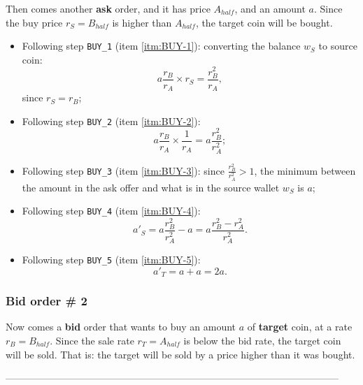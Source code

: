 \documentclass[a4paper,11pt]{article}
\newcommand\ddfrac[2]{\frac{\displaystyle #1}{\displaystyle #2}}
\begin{document}
Then comes another {\bf ask} order, and it has price $A_{half}$, and an amount $a$. Since the buy price 
$r_S = B_{half}$ is higher than $A_{half}$, the target coin will be bought.
	
\begin{itemize}
    \item Following step {\tt BUY\_1} (item \ref{itm:BUY-1}): 
	converting the balance $w_S$ to source coin: 
	\begin{equation*}
	    a \ddfrac{r_B}{r_A} \times r_S = \ddfrac{r_B^2}{r_A},
	\end{equation*}
	since $r_S = r_B$;
  
    \item Following step {\tt BUY\_2} (item \ref{itm:BUY-2}): 
	\begin{equation*}
	    a \ddfrac{r_B}{r_A} \times \ddfrac{1}{r_A} = a \ddfrac{r_B^2}{r_A^2};
	\end{equation*}
	  
    \item Following step {\tt BUY\_3} (item \ref{itm:BUY-3}): 
	since $\ddfrac{r_B^2}{r_A^2} > 1$, the minimum between the amount in the ask offer and 
	what is in the source wallet $w_S$ is $a$;
	
    \item Following step {\tt BUY\_4} (item \ref{itm:BUY-4}): 
	\begin{equation*}
	    a'_{S} = a \ddfrac{r_B^2}{r_A^2} - a = a \ddfrac{r_B^2 - r_A^2}{r_A^2}.
	\end{equation*}
	
    \item Following step {\tt BUY\_5} (item \ref{itm:BUY-5}): 
	\begin{equation*}
	    a'_{T} = a + a = 2 a.
	\end{equation*}
   
\end{itemize}
	
\subsubsection{Bid order \# 2} 
    
Now comes a {\bf bid} order that wants to buy an amount $a$ of {\bf target} coin, at a rate 
$r_B = B_{half}$.  Since the sale rate $r_T = A_{half}$ is below the bid rate, the target coin will be 
sold. That is: the target will be sold by a price higher than it was bought.

------------------------------------------------------------------------------------------------------
\end{document}
